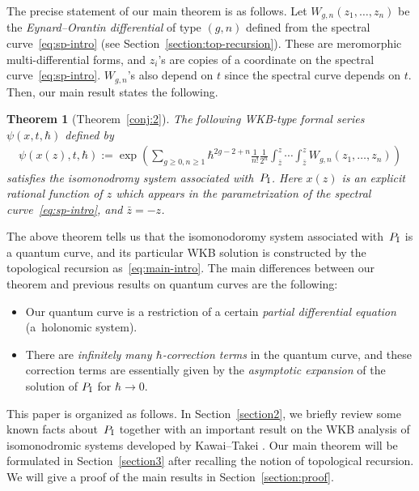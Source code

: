 \documentclass[pdftex]{sigma}
\newtheorem{thm}{Theorem}[section]
\theoremstyle{definition}
\numberwithin{equation}{section}
\def\PI{P_{\rm I}}
\begin{document}
The precise statement of our main theorem is as follows.
Let $W_{g,n}(z_{1},\dots,z_{n})$ be the
{\em Eynard--Orantin differential} of type $(g,n)$
def\/ined from the spectral curve~\eqref{eq:sp-intro}
(see Section~\ref{section:top-recursion}).
These are meromorphic multi-dif\/ferential forms,
and $z_{i}$'s are copies of a coordinate on the
spectral curve~\eqref{eq:sp-intro}.
$W_{g,n}$'s also depend on $t$ since the
spectral curve depends on $t$.
Then, our main result states the following.

\begin{thm}[Theorem~\ref{conj:2}]
The following
WKB-type formal series $\psi(x,t, \hbar)$ defined by
\begin{gather} \label{eq:main-intro}
\psi(x(z),t,\hbar) := \exp\left( \sum_{g \ge 0,  n \ge 1}
\hbar^{2g-2+n}
\frac{1}{n!} \frac{1}{2^{n}} \int^{z}_{\bar{z}}\cdots\int^{z}_{\bar{z}}
W_{g,n}(z_{1},\dots,z_{n})
\right)
\end{gather}
satisfies the isomonodromy system associated with~$\PI$.
Here $x(z)$ is an explicit rational function of $z$ which appears
in the parametrization of the spectral curve~\eqref{eq:sp-intro},
and $\bar{z} = -z$.
\end{thm}

The above theorem tells us that the isomonodoromy system
associated with~$\PI$ is a quantum curve,
and its particular WKB solution is constructed
by the topological recursion as~\eqref{eq:main-intro}.
The main dif\/ferences between our theorem
and previous results on quantum curves are the following:
\begin{itemize}\itemsep=0pt
\item
Our quantum curve is a restriction of a certain
{\em partial differential equation} (a~holonomic system).
\item %
There are {\em infinitely many $\hbar$-correction terms}
in the quantum curve, and these correction terms
are essentially given by the {\em asymptotic expansion}
of the solution of $\PI$ for $\hbar \rightarrow 0$.
\end{itemize}

This paper is organized as follows.
In Section~\ref{section2}, we brief\/ly review some known facts about~$\PI$ together
with an important result on the WKB analysis of
isomonodromic systems developed by Kawai--Takei \cite{KT-PI, KT05}.
Our main theorem will be formulated in Section~\ref{section3}
after recalling the notion of topological recursion.
We will give a proof of the main results in Section~\ref{section:proof}.
\end{document}
